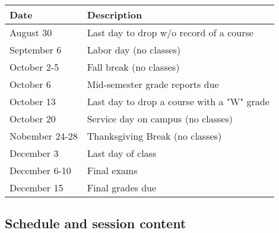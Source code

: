 \documentclass[11pt]{article}
\begin{document}
\begin{center}
\begin{tabular}{ll}
\textbf{Date} & \textbf{Description}\\
\hline
August 30 & Last day to drop w/o record of a course\\
September 6 & Labor day (no classes)\\
October 2-5 & Fall break (no classes)\\
October 6 & Mid-semester grade reports due\\
October 13 & Last day to drop a course with a "W" grade\\
October 20 & Service day on campus (no classes)\\
Nobember 24-28 & Thanksgiving Break (no classes)\\
December 3 & Last day of class\\
December 6-10 & Final exams\\
December 15 & Final grades due\\
\end{tabular}
\end{center}

\subsection{Schedule and session content}
\label{sec:org95b3213}
\end{document}
